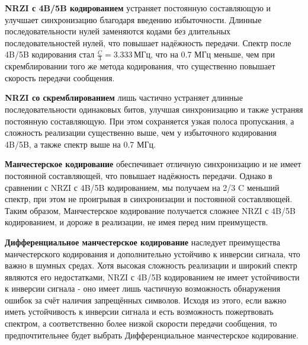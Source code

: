 \textbf{NRZI с 4B/5B кодированием} устраняет постоянную составляющую и улучшает синхронизацию благодаря введению избыточности. Длинные последовательности нулей заменяются кодами без длительных последовательностей нулей, что повышает надёжность передачи. Спектр после 4B/5B кодирования стал $\frac{C}{3} = 3.333 \, \text{МГц}$, что на 0.7 МГц меньше, чем при скремблировании того же метода кодирования, что существенно повышает скорость передачи сообщения.

\textbf{NRZI со скремблированием} лишь частично устраняет длинные последовательности одинаковых битов, улучшая синхронизацию и также устраняя постоянную составляющую. При этом сохраняется узкая полоса пропускания, а сложность реализации существенно выше, чем у избыточного кодирования 4B/5B, а также спектр выше на 0.7 МГц.

\textbf{Манчестерское кодирование} обеспечивает отличную синхронизацию и не имеет постоянной составляющей, что повышает надёжность передачи. Однако в сравнении с NRZI с 4B/5B кодированием, мы получаем на 2/3 C меньший спектр, при этом не проигрывая в синхронизации и постоянной составляющей. Таким образом, Манчестерское кодирование получается сложнее NRZI с 4B/5B кодированием, и дороже в реализации, не имея перед ним преимуществ.

\textbf{Дифференциальное манчестерское кодирование} наследует преимущества манчестерского кодирования и дополнительно устойчиво к инверсии сигнала, что важно в шумных средах. Хотя высокая сложность реализации и широкий спектр являются его недостатками, NRZI с 4B/5B кодированием не имеет устойчивости к инверсии сигнала - оно имеет лишь частичную возможность обнаружения ошибок за счёт наличия запрещённых символов. Исходя из этого, если важно иметь устойчивость к инверсии сигнала и есть возможность пожертвовать спектром, а соответственно более низкой скорости передачи сообщения, то предпочтительнее будет выбрать Дифференциальное манчестерское кодирование.


